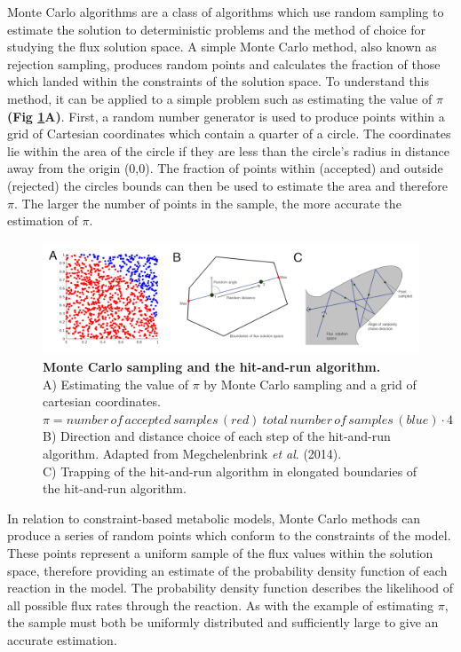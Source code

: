 \documentclass[10pt,letterpaper]{article}
\begin{document}
Monte Carlo algorithms are a class of algorithms which use random sampling to estimate the solution to deterministic problems\cite{Harrison} and the method of choice for studying the flux solution space. A simple Monte Carlo method, also known as rejection sampling, produces random points and calculates the fraction of those which landed within the constraints of the solution space\cite{Wiback}. To understand this method, it can be applied to a simple problem such as estimating the value of $\pi$ \textbf{(Fig \ref{figure:1}A)}. First, a random number generator is used to produce points within a grid of Cartesian coordinates which contain a quarter of a circle. The coordinates lie within the area of the circle if they are less than the circle’s radius in distance away from the origin (0,0). The fraction of points within (accepted) and outside (rejected) the circles bounds can then be used to estimate the area and therefore $\pi$. The larger the number of points in the sample, the more accurate the estimation of $\pi$\cite{MCpi}.

\begin{figure}[!h]
\includegraphics[scale=1]{fig1.png}
\caption{{\bf Monte Carlo sampling and the hit-and-run algorithm.} \\
A) Estimating the value of $\pi$ by Monte Carlo sampling and a grid of cartesian coordinates. $\pi ={number\,of\,accepted\,samples\,(red)} \ {total\,number\,of\,samples\,(blue)} \cdot 4$ \\
B) Direction and distance choice of each step of the hit-and-run algorithm. Adapted from Megchelenbrink \textit{et al}. (2014)\cite{Megchelenbrink}. \\
C) Trapping of the hit-and-run algorithm in elongated boundaries of the hit-and-run algorithm.\\}
\label{figure:1}
\end{figure}

In relation to constraint-based metabolic models, Monte Carlo methods can produce a series of random points which conform to the constraints of the model. These points represent a uniform sample of the flux values within the solution space, therefore providing an estimate of the probability density function of each reaction in the model\cite{Wiback}. The probability density function describes the likelihood of all possible flux rates through the reaction. As with the example of estimating $\pi$, the sample must both be uniformly distributed and sufficiently large to give an accurate estimation.
\end{document}
